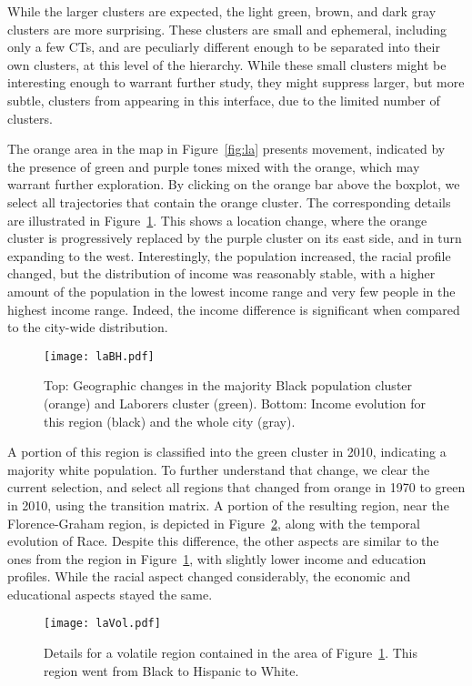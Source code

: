 While the larger clusters are expected, the light green, brown, and dark gray
clusters are more surprising. These clusters are small and ephemeral, including
only a few CTs, and are peculiarly different enough to be separated into their
own clusters, at this level of the hierarchy. While these small clusters might
be interesting enough to warrant further study, they might suppress larger, but
more subtle, clusters from appearing in this interface,  due to the limited
number of clusters.

The orange area in the map in Figure~\ref{fig:la} presents movement, indicated by
the presence of green and purple tones mixed with the orange, which may warrant
further exploration. By clicking on the orange bar above the boxplot, we select
all trajectories that contain the orange cluster. The corresponding details are
illustrated in Figure~\ref{fig:labh}. This shows a location change, where the
orange cluster is progressively replaced by the purple cluster on its east side,
and in turn expanding to the west. Interestingly, the population increased, the
racial profile changed, but the distribution of income was reasonably stable,
with a higher amount of the population in the lowest income range and very few
people in the highest income range. Indeed, the income  difference is
significant when compared to the city-wide distribution.

\begin{figure}
    \centering 
    \texttt{[image: laBH.pdf]}
    \caption{Top: Geographic changes in the majority Black population cluster
    (orange) and Laborers cluster (green). Bottom: Income evolution for this
    region (black) and the whole city (gray).\label{fig:labh}}
\end{figure}


A portion of this region is classified into the green cluster in 2010,
indicating a majority white population. To further understand that change, we
clear the current selection, and select all regions that changed from orange in
1970 to green in 2010, using the transition matrix. A portion of the resulting
region, near the Florence-Graham region, is depicted in Figure~\ref{fig:laVol},
along with the temporal evolution of Race. Despite this difference, the other
aspects are similar to the ones from the region in Figure~\ref{fig:labh}, with
slightly lower income and education profiles. While the racial aspect changed
considerably, the economic and educational aspects stayed the same.

\begin{figure}
    \centering 
    \texttt{[image: laVol.pdf]}
    \caption{Details for a volatile region contained in the area of
         Figure~\ref{fig:labh}. This region went from Black to Hispanic to
        White.\label{fig:laVol}}
\end{figure}


